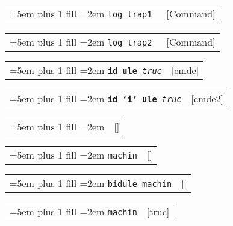 \documentclass{book}
\begin{document}
\begin{titlepage}
%

\noindent\begin{tabularx}{\linewidth}{@{}Xr}
\rightskip=5em plus 1 fill
\hangindent=2em
\texttt{log trap1 \EmbracOn{}\textnormal{\textsl{}}\EmbracOff{}}& [Command]
\end{tabularx}

%

\noindent\begin{tabularx}{\linewidth}{@{}Xr}
\rightskip=5em plus 1 fill
\hangindent=2em
\texttt{log trap2 \EmbracOn{}\textnormal{\textsl{}}\EmbracOff{}}& [Command]
\end{tabularx}

%

\noindent\begin{tabularx}{\linewidth}{@{}Xr}
\rightskip=5em plus 1 fill
\hangindent=2em
\texttt{\textbf{id ule} \EmbracOn{}\textnormal{\textsl{truc}}\EmbracOff{}}& [cmde]
\end{tabularx}

%

\noindent\begin{tabularx}{\linewidth}{@{}Xr}
\rightskip=5em plus 1 fill
\hangindent=2em
\texttt{\textbf{id `\texttt{i}'\ ule} \EmbracOn{}\textnormal{\textsl{truc}}\EmbracOff{}}& [cmde2]
\end{tabularx}

%

\noindent\begin{tabularx}{\linewidth}{@{}Xr}
\rightskip=5em plus 1 fill
\hangindent=2em
\texttt{}& []
\end{tabularx}


\noindent\begin{tabularx}{\linewidth}{@{}Xr}
\rightskip=5em plus 1 fill
\hangindent=2em
\texttt{machin}& []
\end{tabularx}

%

\noindent\begin{tabularx}{\linewidth}{@{}Xr}
\rightskip=5em plus 1 fill
\hangindent=2em
\texttt{bidule machin}& []
\end{tabularx}

%

\noindent\begin{tabularx}{\linewidth}{@{}Xr}
\rightskip=5em plus 1 fill
\hangindent=2em
\texttt{machin}& [truc]
\end{tabularx}


\end{titlepage}
\end{document}

